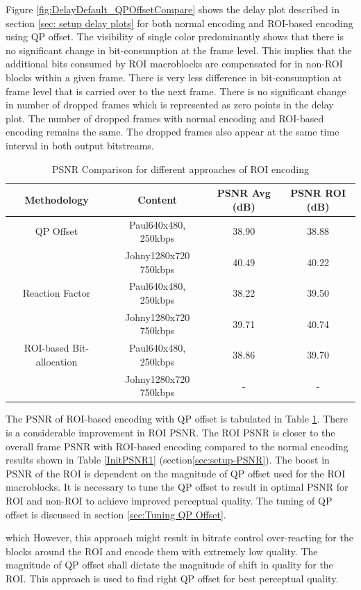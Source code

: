 \documentclass[11pt]{article} %
\begin{document}
 Figure \ref{fig:DelayDefault_QPOffsetCompare} shows the delay plot described in section \ref{sec: setup delay plots} for both normal encoding and ROI-based encoding using QP offset. The visibility of single color predominantly shows that there is no significant change in bit-consumption at the frame level. This implies that the additional bits consumed by ROI macroblocks are compensated for in non-ROI blocks within a given frame. There is very less difference in bit-consumption at frame level that is carried over to the next frame. There is no significant change in number of dropped frames which is represented as zero points in the delay plot. The number of dropped frames with normal encoding and ROI-based encoding remains the same. The dropped frames also appear at the same time interval in both output bitstreams.
 
\begin{table} [h!]
\centering
\begin{tabular}{ |c|c|c|c| }
 \hline
Methodology & Content & PSNR Avg (dB) & PSNR ROI (dB) \\
 \hline 
QP Offset & Paul640x480, 250kbps & 38.90 & 38.88 \\ 
 & Johny1280x720 750kbps & 40.49 & 40.22 \\  
 \hline
Reaction Factor & Paul640x480, 250kbps & 38.22 & 39.50 \\ 
 & Johny1280x720 750kbps & 39.71 & 40.74 \\  
 \hline
ROI-based Bit-allocation & Paul640x480, 250kbps & 38.86 & 39.70 \\ 
& Johny1280x720 750kbps & - & - \\  
\hline 
\end{tabular}
 \caption{PSNR Comparison for different approaches of ROI encoding}
 \label{AllPSNR1}
\end{table}

The PSNR of ROI-based encoding with QP offset is tabulated in Table \ref{AllPSNR1}. There is a considerable improvement in ROI PSNR. The ROI PSNR is closer to the overall frame PSNR with ROI-based encoding compared to the normal encoding results shown in Table \ref{InitPSNR1} (section\ref{sec:setup-PSNR}). The boost in PSNR of the ROI is dependent on the magnitude of QP offset used for the ROI macroblocks. It is necessary to tune the QP offset to result in optimal PSNR for ROI and non-ROI to achieve improved perceptual quality. The tuning of QP offset is discussed in section \ref{sec:Tuning QP Offset}.


\iffalse
which However, this approach might result in bitrate control over-reacting for the blocks around the ROI and encode them with extremely low quality. The magnitude of QP offset shall dictate the magnitude of shift in quality for the ROI. This approach is used to find right QP offset for best perceptual quality.\\
\end{document}
